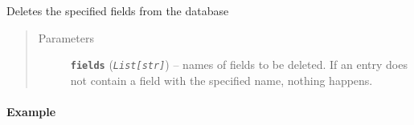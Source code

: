 \documentclass[letterpaper,10pt,english]{sphinxmanual}
\begin{document}
\begin{fulllineitems}
\begin{fulllineitems}
\end{fulllineitems}


\begin{fulllineitems}
\label{modules/pybibtools:listb.pybibtools.Bibliography.del_fields}
Deletes the specified fields from the database
\begin{quote}\begin{description}
\item[{Parameters}] \leavevmode
\textbf{\texttt{fields}} (\emph{\texttt{List{[}str{]}}}) -- names of fields to be deleted. If an entry does not
contain a field with the specified name, nothing happens.

\end{description}\end{quote}
\paragraph{Example}


\end{fulllineitems}
\end{fulllineitems}
\end{document}
